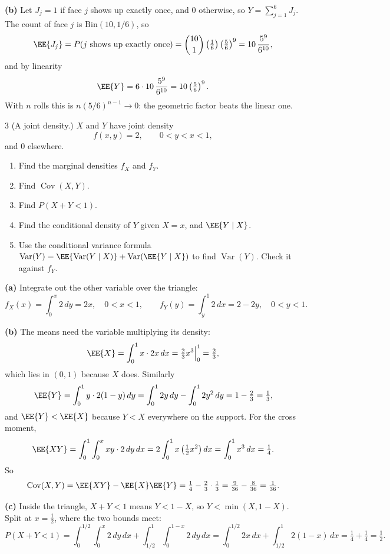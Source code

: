 \documentclass[11pt]{article}
\begin{document}
\textbf{(b)} Let $J_j = 1$ if face $j$ shows up exactly once, and $0$ otherwise, so
$Y = \sum_{j=1}^{6} J_j$. The count of face $j$ is $\mathrm{Bin}(10, 1/6)$, so
\[
  \EE{J_j} = P(j \text{ shows up exactly once})
    = \binom{10}{1}\left(\tfrac16\right)\left(\tfrac56\right)^{9}
    = 10\,\frac{5^9}{6^{10}},
\]
and by linearity
\[
  \EE{Y} = 6 \cdot 10\,\frac{5^9}{6^{10}} = 10\left(\tfrac56\right)^{9}.
\]
With $n$ rolls this is $n(5/6)^{n-1} \to 0$: the geometric factor beats the linear one.

\begin{problem}{3}
  (A joint density.) $X$ and $Y$ have joint density
  \[
    f(x,y) = 2, \qquad 0 < y < x < 1,
  \]
  and $0$ elsewhere.
  \begin{enumerate}
    \item[(a)] Find the marginal densities $f_X$ and $f_Y$.
    \item[(b)] Find $\operatorname{Cov}(X,Y)$.
    \item[(c)] Find $P(X + Y < 1)$.
    \item[(d)] Find the conditional density of $Y$ given $X = x$, and $\EE{Y \mid X}$.
    \item[(e)] Use the conditional variance formula
      $\operatorname{Var}(Y) = \EE{\operatorname{Var}(Y \mid X)} + \operatorname{Var}(\EE{Y \mid X})$
      to find $\operatorname{Var}(Y)$. Check it against $f_Y$.
  \end{enumerate}
\end{problem}
\textbf{(a)} Integrate out the other variable over the triangle:
\[
  f_X(x) = \int_0^x 2\,dy = 2x, \quad 0 < x < 1, \qquad
  f_Y(y) = \int_y^1 2\,dx = 2 - 2y, \quad 0 < y < 1.
\]

\textbf{(b)} The means need the variable multiplying its density:
\[
  \EE{X} = \int_0^1 x \cdot 2x\,dx = \tfrac23 x^3 \Big|_0^1 = \tfrac23,
\]
which lies in $(0,1)$ because $X$ does. Similarly
\[
  \EE{Y} = \int_0^1 y \cdot 2(1-y)\,dy = \int_0^1 2y\,dy - \int_0^1 2y^2\,dy
    = 1 - \tfrac23 = \tfrac13,
\]
and $\EE{Y} < \EE{X}$ because $Y < X$ everywhere on the support. For the cross moment,
\[
  \EE{XY} = \int_0^1 \int_0^x xy \cdot 2\,dy\,dx
    = 2\int_0^1 x \left(\tfrac12 x^2\right) dx = \int_0^1 x^3\,dx = \tfrac14.
\]
So
\[
  \operatorname{Cov}(X,Y) = \EE{XY} - \EE{X}\EE{Y}
    = \tfrac14 - \tfrac23 \cdot \tfrac13 = \tfrac{9}{36} - \tfrac{8}{36} = \tfrac{1}{36}.
\]

\textbf{(c)} Inside the triangle, $X + Y < 1$ means $Y < 1 - X$, so $Y < \min(X, 1 - X)$.
Split at $x = \tfrac12$, where the two bounds meet:
\[
  P(X + Y < 1) = \int_0^{1/2} \int_0^x 2\,dy\,dx + \int_{1/2}^1 \int_0^{1-x} 2\,dy\,dx
    = \int_0^{1/2} 2x\,dx + \int_{1/2}^1 2(1-x)\,dx
    = \tfrac14 + \tfrac14 = \tfrac12.
\]
\end{document}
